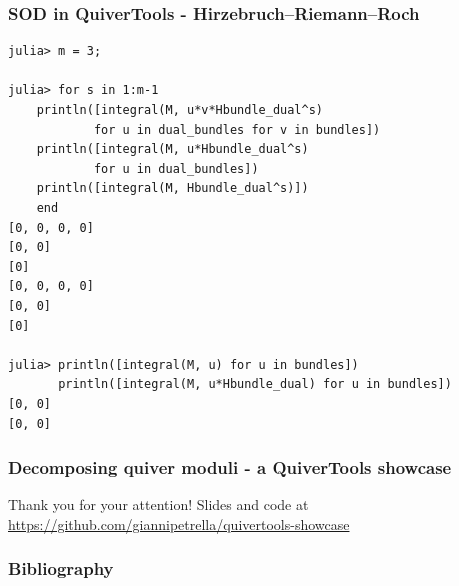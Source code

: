 \documentclass{beamer}
\begin{document}
\begin{frame}[fragile]
    \frametitle{SOD in QuiverTools - Hirzebruch--Riemann--Roch}
\scriptsize{
\begin{lstlisting}
julia> m = 3;

julia> for s in 1:m-1
    println([integral(M, u*v*Hbundle_dual^s)
            for u in dual_bundles for v in bundles])
    println([integral(M, u*Hbundle_dual^s)
            for u in dual_bundles])
    println([integral(M, Hbundle_dual^s)])
    end
[0, 0, 0, 0]
[0, 0]
[0]
[0, 0, 0, 0]
[0, 0]
[0]

julia> println([integral(M, u) for u in bundles])
       println([integral(M, u*Hbundle_dual) for u in bundles])
[0, 0]
[0, 0]       
\end{lstlisting}
}
\end{frame}

\begin{frame}
    \frametitle{Decomposing quiver moduli - a QuiverTools showcase}
\begin{center}
    Thank you for your attention!
    \vfill
    Slides and code at \href{https://github.com/giannipetrella/quivertools-showcase}{https://github.com/giannipetrella/quivertools-showcase}
\end{center}
\end{frame}

\begin{frame}
    \frametitle{Bibliography}

\printbibliography

\end{frame}
\end{document}
